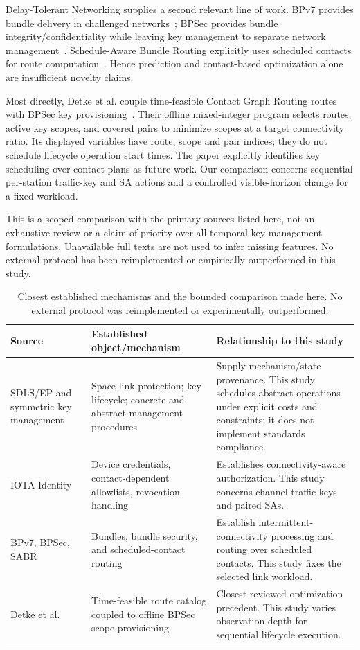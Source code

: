 \documentclass[conference]{IEEEtran}
\begin{document}
Delay-Tolerant Networking supplies a second relevant line of work. BPv7 provides bundle delivery in challenged networks~\cite{bp}; BPSec provides bundle integrity/confidentiality while leaving key management to separate network management~\cite{bpsec}. Schedule-Aware Bundle Routing explicitly uses scheduled contacts for route computation~\cite{sabr}. Hence prediction and contact-based optimization alone are insufficient novelty claims.

Most directly, Detke et al. couple time-feasible Contact Graph Routing routes with BPSec key provisioning~\cite{detke}. Their offline mixed-integer program selects routes, active key scopes, and covered pairs to minimize scopes at a target connectivity ratio. Its displayed variables have route, scope and pair indices; they do not schedule lifecycle operation start times. The paper explicitly identifies key scheduling over contact plans as future work. Our comparison concerns sequential per-station traffic-key and SA actions and a controlled visible-horizon change for a fixed workload.

This is a scoped comparison with the primary sources listed here, not an exhaustive review or a claim of priority over all temporal key-management formulations. Unavailable full texts are not used to infer missing features. No external protocol has been reimplemented or empirically outperformed in this study.

\begin{table}[t]
\centering\small
\caption{Closest established mechanisms and the bounded comparison made here. No external protocol was reimplemented or experimentally outperformed.}
\label{tab:related}
\begin{tabular}{p{}p{}p{}}
\toprule
Source & Established object/mechanism & Relationship to this study \\
\midrule
SDLS/EP and symmetric key management~\cite{sdls,ep,skm} & Space-link protection; key lifecycle; concrete and abstract management procedures & Supply mechanism/state provenance. This study schedules abstract operations under explicit costs and constraints; it does not implement standards compliance. \\
IOTA Identity~\cite{iota} & Device credentials, contact-dependent allowlists, revocation handling & Establishes connectivity-aware authorization. This study concerns channel traffic keys and paired SAs. \\
BPv7, BPSec, SABR~\cite{bp,bpsec,sabr} & Bundles, bundle security, and scheduled-contact routing & Establish intermittent-connectivity processing and routing over scheduled contacts. This study fixes the selected link workload. \\
Detke et al.~\cite{detke} & Time-feasible route catalog coupled to offline BPSec scope provisioning & Closest reviewed optimization precedent. This study varies observation depth for sequential lifecycle execution. \\
\bottomrule
\end{tabular}
\end{table}
\end{document}
